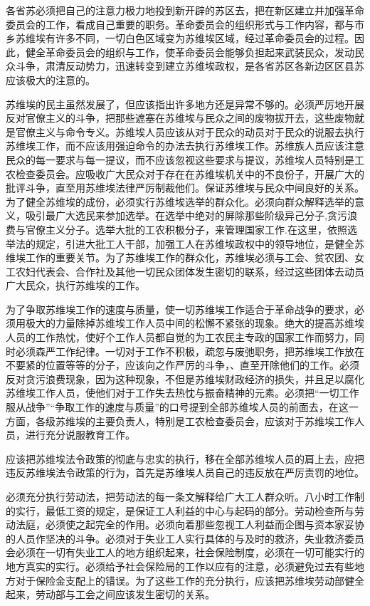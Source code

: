 各省苏必须把自己的注意力极力地投到新开辟的苏区去，把在新区建立并加强革命委员会的工作，看成自己重要的职务。革命委员会的组织形式与工作内容，都与市乡苏维埃有许多不同，一切白色区域变为苏维埃区域，经过革命委员会的过程。因此，健全革命委员会的组织与工作，使革命委员会能够负担起来武装民众，发动民众斗争，肃清反动势力，迅速转变到建立苏维埃政权，是各省苏区各新边区区县苏应该极大的注意的。

苏维埃的民主虽然发展了，但应该指出许多地方还是异常不够的。必须严厉地开展反对官僚主义的斗争，把那些遮塞在苏维埃与民众之间的废物拔开去，这些废物就是官僚主义与命令专义。苏维埃人员应该从对于民众的动员对于民众的说服去执行苏维埃工作，而不应该用强迫命令的办法去执行苏维埃工作。苏维族人员应该注意民众的每一要求与每一提议，而不应该忽视这些要求与提议，苏维埃人员特别是工农检查委员会。应吸收广大民众对于存在在苏维埃机关中的不良份子，开展广大的批评斗争，直至用苏维埃法律严厉制裁他们。保证苏维埃与民众中间良好的关系。为了健全苏维埃的成份，必须实行苏维埃选举的群众化。必须向群众解释选举的意义，吸引最广大选民来参加选举。在选举中绝对的屏除那些阶级异己分子,贪污浪费与官僚主义分子。选举大批的工农积极分子，来管理国家工作.在这里，依照选举法的规定，引进大批工人干部，加强工人在苏维埃政权中的领导地位，是健全苏维埃工作的重要关节。为了苏维埃工作的群众化，苏维埃必须与工会、贫农团、女工农妇代表会、合作社及其他一切民众团体发生密切的联系，经过这些团体去动员广大民众，执行苏维埃的工作。

为了争取苏维埃工作的速度与质量，使一切苏维埃工作适合于革命战争的要求，必须用极大的力量除掉苏维埃工作人员中间的松懈不紧张的现象。绝大的提高苏维埃人员的工作热忱，使好个工作人员都自觉的为工农民主专政的国家工作而努力，同时必须森严工作纪律。一切对于工作不积极，疏忽与废弛职务，把苏维埃工作放在不要紧的位置等等的分子，应该向之作严厉的斗争，、直至开除他们的工作。必须反对贪污浪费现象，因为这种现象，不但是苏维埃财政经济的损失，并且足以腐化苏维埃工作人员，使他们对于工作失去热忱与振奋精神的元素。必须把“一切工作服从战争”“争取工作的速度与质量”的口号提到全部苏维埃人员的前面去，在这一方面，各级苏维埃的主要负责人，特别是工农检查委员会，应该对于苏维埃工作人员，进行充分说服教育工作。

应该把苏维埃法令政策的彻底与忠实的执行，移在全部苏维埃人员的肩上去，应把违反苏维埃法令政策的行为，首先是苏维埃人员自己的违反放在严厉责罚的地位。

必须充分执行劳动法，把劳动法的每一条文解释给广大工人群众听。八小时工作制的实行，最低工资的规定，是保证工人利益的中心与起码的部分。劳动检查所与劳动法庭，必须使之起完全的作用。必须向着那些忽视工人利益而企图与资本家妥协的人员作坚决的斗争。必须对于失业工人实行具体的与及时的救济，失业救济委员会必须在一切有失业工人的地方组织起来，社会保险制度，必须在一切可能实行的地方真实的实行。必须给予社会保险局的工作以应有的注意，必须避免过去有些地方对于保险金支配上的错误。为了这些工作的充分执行，应该把苏维埃劳动部健全起来，劳动部与工会之间应该发生密切的关系。

